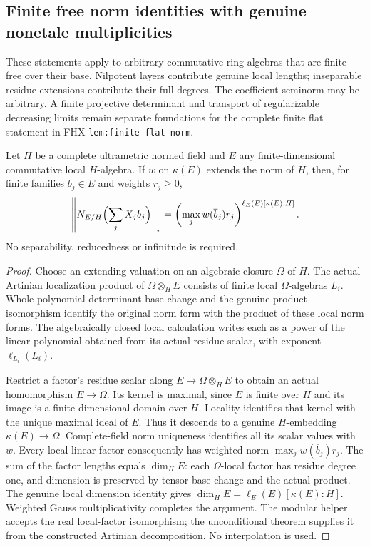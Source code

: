 \subsection{Finite free norm identities with genuine nonetale multiplicities}
\label{subsec:finite-free-norms}

These statements apply to arbitrary commutative-ring algebras that are finite
free over their base. Nilpotent layers contribute genuine local lengths;
inseparable residue extensions contribute their full degrees. The coefficient
seminorm may be arbitrary. A finite projective determinant and transport of
regularizable decreasing limits remain separate foundations for the complete
finite flat statement in FHX \texttt{lem:finite-flat-norm}.

\begin{theorem}
\label{spectrum:nonetale-local-weighted-norm}
\leanok
{}
Let $H$ be a complete ultrametric normed field and $E$ any finite-dimensional
commutative local $H$-algebra. If $w$ on $\kappa(E)$ extends the norm of $H$,
then, for finite families $b_j\in E$ and weights $r_j\geq0$,
\[
 \left\|N_{E/H}\Bigl(\sum_jX_jb_j\Bigr)\right\|_r
 =\left(\max_jw(\overline b_j)r_j\right)^{\ell_E(E)[\kappa(E):H]}.
\]
No separability, reducedness or infinitude is required.
\end{theorem}
\begin{proof}
Choose an extending valuation on an algebraic closure $\Omega$ of $H$.
The actual Artinian localization product of $\Omega\otimes_HE$ consists
of finite local $\Omega$-algebras $L_i$. Whole-polynomial determinant base
change and the genuine product isomorphism identify the original norm form
with the product of these local norm forms. The algebraically closed local
calculation writes each as a power of the linear polynomial obtained from
its actual residue scalar, with exponent $\ell_{L_i}(L_i)$.

Restrict a factor's residue scalar along $E\to\Omega\otimes_HE$ to obtain
an actual homomorphism $E\to\Omega$. Its kernel is maximal, since $E$ is
finite over $H$ and its image is a finite-dimensional domain over $H$.
Locality identifies that kernel with the unique maximal ideal of $E$.
Thus it descends to a genuine $H$-embedding $\kappa(E)\to\Omega$.
Complete-field norm uniqueness identifies all its scalar values with $w$.
Every local linear factor consequently has weighted norm
$\max_jw(\overline b_j)r_j$. The sum of the factor lengths equals
$\dim_H E$: each $\Omega$-local factor has residue degree one, and dimension
is preserved by tensor base change and the actual product. The genuine
local dimension identity gives $\dim_HE=\ell_E(E)[\kappa(E):H]$.
Weighted Gauss multiplicativity completes the argument. The modular helper
accepts the real local-factor isomorphism; the unconditional theorem supplies
it from the constructed Artinian decomposition. No interpolation is used.
\end{proof}

